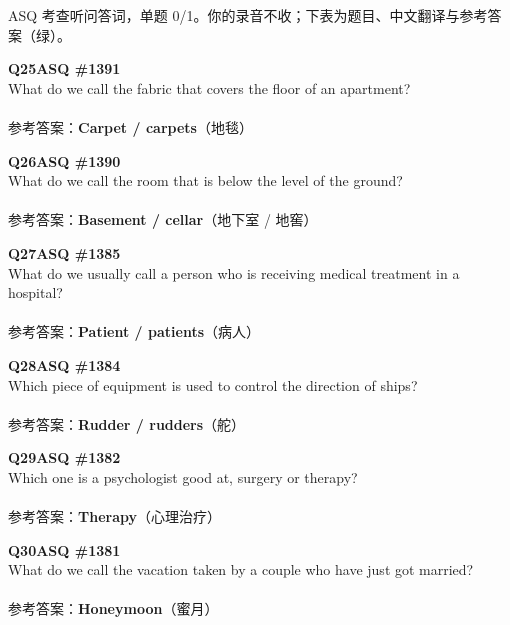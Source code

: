 \begin{notebox}
{\footnotesize\color{gray}ASQ 考查听问答词，单题 0/1。你的录音不收；下表为题目、中文翻译与参考答案（绿）。}
\smallskip\par
\textbf{Q25\quad ASQ \#1391}\\
What do we call the fabric that covers the floor of an apartment?\\
\\
参考答案：{\color{cFix}\textbf{Carpet / carpets}}（地毯）
\par\smallskip
\textbf{Q26\quad ASQ \#1390}\\
What do we call the room that is below the level of the ground?\\
\\
参考答案：{\color{cFix}\textbf{Basement / cellar}}（地下室 / 地窖）
\par\smallskip
\textbf{Q27\quad ASQ \#1385}\\
What do we usually call a person who is receiving medical treatment in a hospital?\\
\\
参考答案：{\color{cFix}\textbf{Patient / patients}}（病人）
\par\smallskip
\textbf{Q28\quad ASQ \#1384}\\
Which piece of equipment is used to control the direction of ships?\\
\\
参考答案：{\color{cFix}\textbf{Rudder / rudders}}（舵）
\par\smallskip
\textbf{Q29\quad ASQ \#1382}\\
Which one is a psychologist good at, surgery or therapy?\\
\\
参考答案：{\color{cFix}\textbf{Therapy}}（心理治疗）
\par\smallskip
\textbf{Q30\quad ASQ \#1381}\\
What do we call the vacation taken by a couple who have just got married?\\
\\
参考答案：{\color{cFix}\textbf{Honeymoon}}（蜜月）
\end{notebox}
